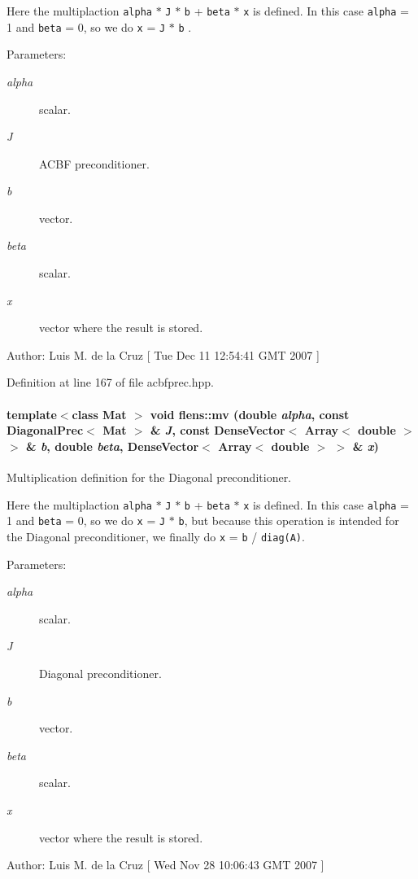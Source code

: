 Here the multiplaction {\tt alpha} $\ast$ {\tt J} $\ast$ {\tt b} + {\tt beta} $\ast$ {\tt x} is defined. In this case {\tt alpha} = 1 and {\tt beta} = 0, so we do {\tt x} = {\tt J} $\ast$ {\tt b} . \begin{Desc}
\item[Parameters:]
\begin{description}
\item[{\em alpha}]scalar. \item[{\em J}]ACBF preconditioner. \item[{\em b}]vector. \item[{\em beta}]scalar. \item[{\em x}]vector where the result is stored. \end{description}
\end{Desc}
\begin{Desc}
\item[Author:]Luis M. de la Cruz \mbox{[} Tue Dec 11 12:54:41 GMT 2007 \mbox{]} \end{Desc}


Definition at line 167 of file acbfprec.hpp.\hypertarget{namespaceflens_dcd31328a4165977fc58d8caf75f4b73}{
\paragraph[{mv}]{\setlength{\rightskip}{0pt plus 5cm}template$<$class Mat $>$ void flens::mv (double {\em alpha}, \/  const DiagonalPrec$<$ {\bf Mat} $>$ \& {\em J}, \/  const DenseVector$<$ Array$<$ double $>$ $>$ \& {\em b}, \/  double {\em beta}, \/  DenseVector$<$ Array$<$ double $>$ $>$ \& {\em x})}\hfill}
\label{namespaceflens_dcd31328a4165977fc58d8caf75f4b73}


Multiplication definition for the Diagonal preconditioner. 

Here the multiplaction {\tt alpha} $\ast$ {\tt J} $\ast$ {\tt b} + {\tt beta} $\ast$ {\tt x} is defined. In this case {\tt alpha} = 1 and {\tt beta} = 0, so we do {\tt x} = {\tt J} $\ast$ {\tt b}, but because this operation is intended for the Diagonal preconditioner, we finally do {\tt x} = {\tt b} / {\tt diag(A)}. \begin{Desc}
\item[Parameters:]
\begin{description}
\item[{\em alpha}]scalar. \item[{\em J}]Diagonal preconditioner. \item[{\em b}]vector. \item[{\em beta}]scalar. \item[{\em x}]vector where the result is stored. \end{description}
\end{Desc}
\begin{Desc}
\item[Author:]Luis M. de la Cruz \mbox{[} Wed Nov 28 10:06:43 GMT 2007 \mbox{]} \end{Desc}


